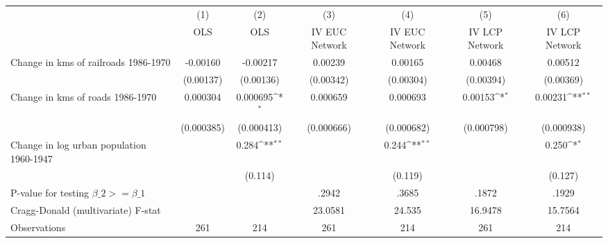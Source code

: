 {
\def\sym#1{\ifmmode^{#1}\else\(^{#1}\)\fi}
\begin{tabular}{l*{6}{c}}
\hline\hline
                &\multicolumn{1}{c}{(1)}&\multicolumn{1}{c}{(2)}&\multicolumn{1}{c}{(3)}&\multicolumn{1}{c}{(4)}&\multicolumn{1}{c}{(5)}&\multicolumn{1}{c}{(6)}\\
                &\multicolumn{1}{c}{OLS}&\multicolumn{1}{c}{OLS}&\multicolumn{1}{c}{IV EUC Network}&\multicolumn{1}{c}{IV EUC Network}&\multicolumn{1}{c}{IV LCP Network}&\multicolumn{1}{c}{IV LCP Network}\\
\hline
Change in kms of railroads 1986-1970& -0.00160         & -0.00217         &  0.00239         &  0.00165         &  0.00468         &  0.00512         \\
                &(0.00137)         &(0.00136)         &(0.00342)         &(0.00304)         &(0.00394)         &(0.00369)         \\
[1em]
Change in kms of roads 1986-1970& 0.000304         & 0.000695\sym{*}  & 0.000659         & 0.000693         &  0.00153\sym{*}  &  0.00231\sym{**} \\
                &(0.000385)         &(0.000413)         &(0.000666)         &(0.000682)         &(0.000798)         &(0.000938)         \\
[1em]
Change in log urban population 1960-1947&                  &    0.284\sym{**} &                  &    0.244\sym{**} &                  &    0.250\sym{*}  \\
                &                  &  (0.114)         &                  &  (0.119)         &                  &  (0.127)         \\
\hline
P-value for testing $\beta\_{2} >= \beta\_{1}$&                  &                  &    .2942         &    .3685         &    .1872         &    .1929         \\
Cragg-Donald (multivariate) F-stat&                  &                  &  23.0581         &   24.535         &  16.9478         &  15.7564         \\
Observations    &      261         &      214         &      261         &      214         &      261         &      214         \\
\hline\hline
\end{tabular}
}
